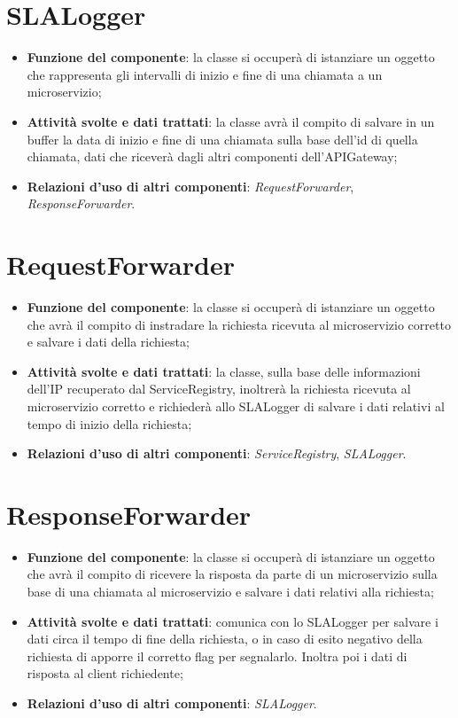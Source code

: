 \chapter{SLALogger}
\begin{itemize}
	\item \textbf{Funzione del componente}: la classe si occuper\`{a} di istanziare un oggetto che rappresenta gli intervalli di inizio e fine di una chiamata a un microservizio;
	\item \textbf{Attivit\`{a} svolte e dati trattati}:  la classe avr\`{a} il compito di salvare in un buffer la data di inizio e fine di una chiamata sulla base dell'id di quella chiamata, dati che ricever\`{a} dagli altri componenti dell'APIGateway;
	\item \textbf{Relazioni d'uso di altri componenti}: \textit{RequestForwarder}, \textit{ResponseForwarder}.
\end{itemize}

\chapter{RequestForwarder}
\begin{itemize}
	\item \textbf{Funzione del componente}: la classe si occuper\`{a} di istanziare un oggetto che avr\`{a} il compito di instradare la richiesta ricevuta al microservizio corretto e salvare i dati della richiesta;
	\item \textbf{Attivit\`{a} svolte e dati trattati}: la classe, sulla base delle informazioni dell'IP recuperato dal ServiceRegistry, inoltrer\`{a} la richiesta ricevuta al microservizio corretto e richieder\`{a} allo SLALogger di salvare i dati relativi al tempo di inizio della richiesta;
	\item \textbf{Relazioni d'uso di altri componenti}: \textit{ServiceRegistry}, \textit{SLALogger}.
\end{itemize}

\chapter{ResponseForwarder}
\begin{itemize}
	\item \textbf{Funzione del componente}: la classe si occuper\`{a} di istanziare un oggetto che avr\`{a} il compito di ricevere la risposta da parte di un microservizio sulla base di una chiamata al microservizio e salvare i dati relativi alla richiesta;
	\item \textbf{Attivit\`{a} svolte e dati trattati}: comunica con lo SLALogger per salvare i dati circa il tempo di fine della richiesta, o in caso di esito negativo della richiesta di apporre il corretto flag per segnalarlo. Inoltra poi i dati di risposta al client richiedente;
	\item \textbf{Relazioni d'uso di altri componenti}: \textit{SLALogger}.
\end{itemize}

